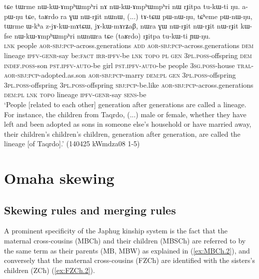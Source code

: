 \begin{exe}
\ex \label{ex:taRrdo.rJitpa}
\gll tɕe tɯrme nɯ-kɯ-ɤmpʰɯmpʰri nɤ nɯ-kɯ-ɤmpʰɯmpʰri nɯ rɟitpa tu-kɯ-ti ŋu. a-pɯ-ŋu tɕe, taʁrdo ra ɣɯ nɯ-rɟit nɯnɯ, (...) tɤ-tɕɯ pɯ-nɯ-ŋu, tɕʰeme pɯ-nɯ-ŋu,  tɯrme ɯ-kʰa z-jɤ-kɯ-mɤtɕɯ, jɤ-kɯ-mɤrʑaβ, nɯra ɣɯ nɯ-rɟit nɯ-rɟit nɯ-rɟit kɯ-fse nɯ-kɯ-ɤmpʰɯmpʰri nɯnɯra tɕe (taʁrdo) rɟitpa tu-kɯ-ti ɲɯ-ŋu. \\
\textsc{lnk} people \textsc{aor}-\textsc{sbj}:\textsc{pcp}-across.generations \textsc{add} \textsc{aor}-\textsc{sbj}:\textsc{pcp}-across.generations \textsc{dem} lineage \textsc{ipfv}-\textsc{genr}-say be:\textsc{fact} \textsc{irr}-\textsc{ipfv}-be \textsc{lnk}  \textsc{topo} \textsc{pl} \textsc{gen} \textsc{3pl}.\textsc{poss}-offspring \textsc{dem} { } \textsc{indef}.\textsc{poss}-son \textsc{pst}.\textsc{ipfv}-\textsc{auto}-be  girl  \textsc{pst}.\textsc{ipfv}-\textsc{auto}-be  people \textsc{3sg}.\textsc{poss}-house \textsc{tral}-\textsc{aor}-\textsc{sbj}:\textsc{pcp}-adopted.as.son \textsc{aor}-\textsc{sbj}:\textsc{pcp}-marry \textsc{dem}:\textsc{pl} \textsc{gen} \textsc{3pl}.\textsc{poss}-offspring  \textsc{3pl}.\textsc{poss}-offspring  \textsc{3pl}.\textsc{poss}-offspring \textsc{sbj}:\textsc{pcp}-be.like  \textsc{aor}-\textsc{sbj}:\textsc{pcp}-across.generations \textsc{dem}:\textsc{pl} \textsc{lnk}  \textsc{topo} lineage \textsc{ipfv}-\textsc{genr}-say \textsc{sens}-be \\
\glt `People [related to each other] generation after generations are called a lineage. For instance, the children from Taqrdo, (...) male or female, whether they have left and been adopted as sons in someone else's household or have married away, their children's children's children, generation after generation, are called the lineage [of Taqrdo].' (140425 kWmdza08 1-5)
\end{exe}
 
\section{Omaha skewing} \label{sec:omaha}

\subsection{Skewing rules and merging rules} \label{sec:skewing.merging}
A prominent specificity of the Japhug kinship system is the fact that the maternal cross-cousins (MBCh) and their children (MBSCh)  are referred to by the same term as their parents (MB, MBW) as explained in (\ref{ex:MBCh.2}), and conversely that the maternal cross-cousins (FZCh) are identified with the sisters's children (ZCh) (\ref{ex:FZCh.2}).  

